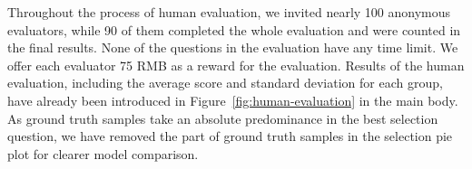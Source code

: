 Throughout the process of human evaluation, we invited nearly 100 anonymous evaluators, while 90 of them completed the whole evaluation and were counted in the final results. None of the questions in the evaluation have any time limit. We offer each evaluator 75 RMB as a reward for the evaluation. Results of the human evaluation, including the average score and standard deviation for each group, have already been introduced in Figure~\ref{fig:human-evaluation} in the main body. As ground truth samples take an absolute predominance in the best selection question, we have removed the part of ground truth samples in the selection pie plot for clearer model comparison.



